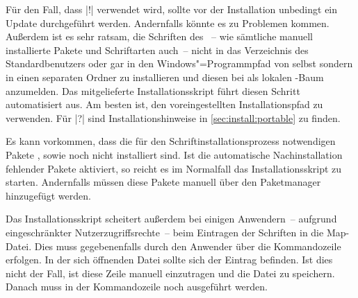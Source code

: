 
Für den Fall, dass |!| verwendet wird, sollte vor 
der Installation unbedingt ein Update durchgeführt werden. Andernfalls könnte 
es zu Problemen kommen. Außerdem ist es sehr ratsam, die Schriften des \CDs~-- 
wie sämtliche manuell installierte Pakete und Schriftarten auch~-- nicht in das 
Verzeichnis des Standardbenutzers oder gar in den Windows"=Programmpfad von 
 selbst sondern in einen separaten Ordner zu 
installieren und diesen bei  als lokalen 
-Baum anzumelden. Das mitgelieferte Installationsskript führt 
diesen Schritt automatisiert aus. Am besten ist, den voreingestellten 
Installationspfad zu verwenden. Für |?| 
sind Installationshinweise in \autoref{sec:install:portable} zu finden.

Es kann vorkommen, dass die für den Schriftinstallationsprozess notwendigen 
Pakete ,  sowie  noch nicht 
installiert sind. Ist die automatische Nachinstallation fehlender Pakete 
aktiviert, so reicht es im Normalfall das Installationsskript zu starten. 
Andernfalls müssen diese Pakete manuell über den Paketmanager hinzugefügt
werden.

Das Installationsskript scheitert außerdem bei einigen Anwendern~-- aufgrund 
eingeschränkter Nutzerzugriffsrechte~-- beim Eintragen der Schriften in die 
Map-Datei. Dies muss gegebenenfalls durch den Anwender über die Kommandozeile 
 erfolgen. In der sich öffnenden 
Datei sollte sich der Eintrag  befinden. Ist dies nicht 
der Fall, ist diese Zeile manuell einzutragen und die Datei zu speichern. 
Danach muss in der Kommandozeile noch  ausgeführt 
werden.


